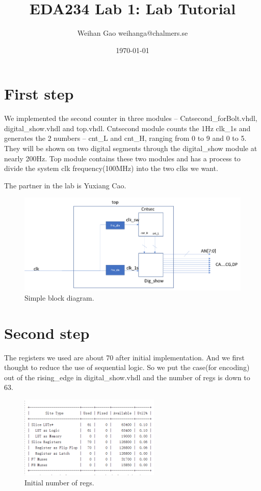 \documentclass[a4paper]{article}
\title{EDA234 Lab 1:  Lab Tutorial}
\author{Weihan Gao weihanga@chalmers.se}
\date{\today}
\begin{document}
\sloppy
\maketitle


\section{First step}
\label{sec:introduction}
We implemented the second counter in three modules – Cntsecond\_forBolt.vhdl, digital\_show.vhdl and top.vhdl. Cntsecond module counts the 1Hz clk\_1s and generates the 2 numbers – cnt\_L and cnt\_H, ranging from 0 to 9 and 0 to 5. They will be shown on two digital segments through the digital\_show module at nearly 200Hz. Top module contains these two modules and has a process to divide the system clk frequency(100MHz) into the two clks we want.


The partner in the lab is Yuxiang Cao.

\begin{figure}[h]
\centering
\includegraphics[width=1\textwidth]{1.png}
\caption{\label{fig:data}Simple block diagram.}
\end{figure}


\newpage

\section{Second step}
The registers we used are about 70 after initial implementation. And we first thought to reduce the use of sequential logic. So we put the case(for encoding) out of the rising\_edge in digital\_show.vhdl and the number of regs is down to 63.


\begin{figure}[h]
\centering
\includegraphics[width=0.6\textwidth]{2.png}
\caption{\label{fig:data}Initial number of regs.}
\end{figure}
\end{document}
